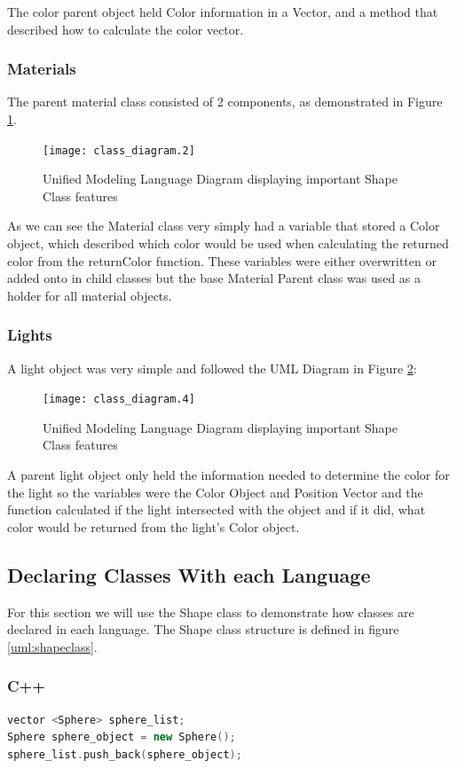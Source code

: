 The color parent object held Color information in a Vector, and a method that described how to calculate the color vector.

\subsubsection{Materials}
The parent material class consisted of 2 components, as demonstrated in Figure \ref{uml:materialclass}.

\begin{figure}[!ht]
\centering
	\texttt{[image: class\_diagram.2]}
\caption{Unified Modeling Language Diagram displaying important Shape Class features}
\label{uml:materialclass}
\end{figure}

As we can see the Material class very simply had a variable that stored a Color object, which described which color would be used when calculating the returned color from the returnColor function.  These variables were either overwritten or added onto in child classes but the base Material Parent class was used as a holder for all material objects.
\subsubsection{Lights}
A light object was very simple and followed the UML Diagram in Figure \ref{uml:lightclass}:
\begin{figure}[!ht]
\centering
	\texttt{[image: class\_diagram.4]}
\caption{Unified Modeling Language Diagram displaying important Shape Class features}
\label{uml:lightclass}
\end{figure}
A parent light object only held the information needed to determine the color for the light so the variables were the Color Object and Position Vector and the function calculated if the light intersected with the object and if it did, what color would be returned from the light's Color object.

\subsection{Declaring Classes With each Language}
For this section we will use the Shape class to demonstrate how classes are declared in each language.  The Shape class structure is defined in figure \ref{uml:shapeclass}.
\subsubsection{C++}
\begin{lstlisting}[language=C++, caption=C++ Class definition example, style=mystyle]
vector <Sphere> sphere_list;
Sphere sphere_object = new Sphere();
sphere_list.push_back(sphere_object);
\end{lstlisting}
